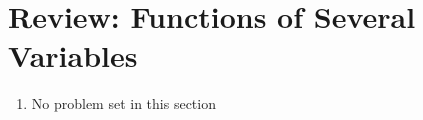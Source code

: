 \section{Review: Functions of Several Variables}

\begin{enumerate}
    \item No problem set in this section
\end{enumerate}